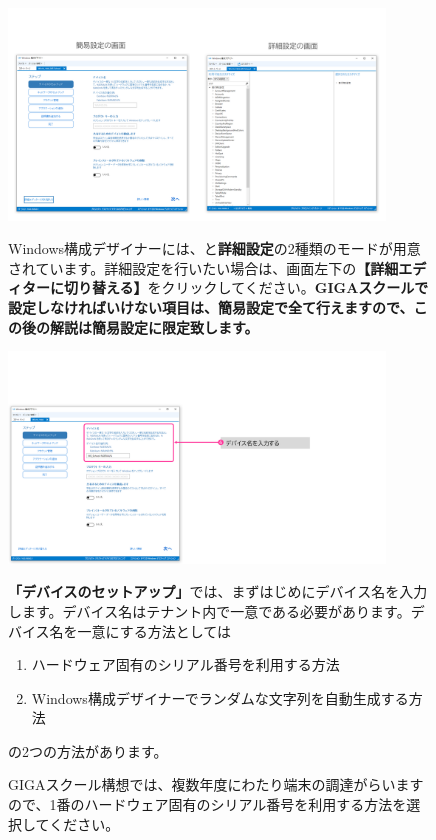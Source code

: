 \begin{figure}[hp]
    \begin{minipage}{0.6\textwidth}
        \vspace{-0.5cm}
        \includegraphics[width=10cm]{figures/MakeProvisioningPackage-04}
    \end{minipage}
    \begin{minipage}{0.4\textwidth}
        Windows構成デザイナーには、と\textbf{詳細設定}の2種類のモードが用意されています。詳細設定を行いたい場合は、画面左下の\textbf{【詳細エディターに切り替える】}をクリックしてください。\textbf{GIGAスクールで設定しなければいけない項目は、簡易設定で全て行えますので、この後の解説は簡易設定に限定致します。}
    \end{minipage}
\end{figure}

\begin{figure}[hp]
    \begin{minipage}{0.6\textwidth}
        \vspace{-2.5cm}
        \includegraphics[width=10cm]{figures/MakeProvisioningPackage-05}
    \end{minipage}
    \begin{minipage}{0.4\textwidth}
        \textbf{「デバイスのセットアップ」}では、まずはじめにデバイス名を入力します。デバイス名はテナント内で一意である必要があります。デバイス名を一意にする方法としては 
        \begin{enumerate}
            \item ハードウェア固有のシリアル番号を利用する方法
            \item Windows構成デザイナーでランダムな文字列を自動生成する方法
        \end{enumerate}
        の2つの方法があります。

        GIGAスクール構想では、複数年度にわたり端末の調達がらいますので、1番のハードウェア固有のシリアル番号を利用する方法を選択してください。
    \end{minipage}
\end{figure}

